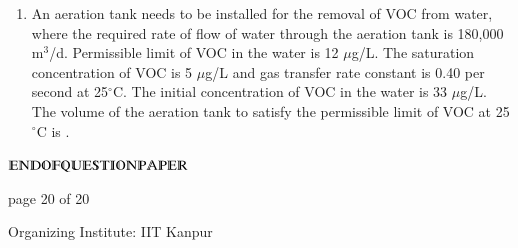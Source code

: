 \documentclass[journal,12pt,onecolumn]{IEEEtran}
\theoremstyle{remark}
\begin{document}
\begin{enumerate}[start=1, label={Q\arabic*.}]
\item An aeration tank needs to be installed for the removal of VOC from water, where the required rate of flow of water through the aeration tank is 180,000 m$^3$/d. Permissible limit of VOC in the water is 12 $\mu$g/L. The saturation concentration of VOC is 5 $\mu$g/L and gas transfer rate constant is 0.40 per second at 25$^\circ$C. The initial concentration of VOC in the water is 33 $\mu$g/L. The volume of the aeration tank to satisfy the permissible limit of VOC at 25$^\circ$C is \underline{\hspace{2cm}} .  
\hfill{}
\end{enumerate}
\centering
$\varmathbb{END OF QUESTION PAPER}$
\vfill
\begin{center}
{\Large page 20 of 20}
\end{center}
\RaggedRight
{\color{orange}
{\Large Organizing Institute: IIT Kanpur}}
\end{document}
